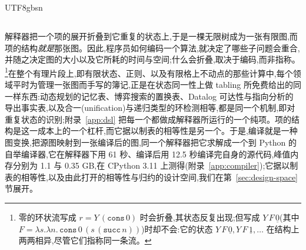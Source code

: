 \begin{CJK*}{UTF8}{gbsn}
  \subsection{}\label{sec:graphs}
  \ifPaperChinese
  解释器把一个项的展开折叠到它重复的状态上,于是一棵无限树成为一张有限图,而项的结构\emph{就是}那张图。因此,程序员如何编码一个算法,就决定了哪些子问题会重合,并随之决定图的大小以及它所耗的时间与空间;什么会折叠,取决于编码,而非指称。\footnote{零的环状流写成 $r = Y\,(\mathtt{cons}\,0)$ 时会折叠,其状态反复出现;但写成 $Y\,F\,\underline{0}$(其中 $F = \lambda s.\lambda n.\,\mathtt{cons}\,0\,(s\,(\mathtt{succ}\,n))$)时却不会:它的状态 $Y\,F\,\underline{0}, Y\,F\,\underline{1}, \dots$ 在结构上两两相异,尽管它们指称同一条流。}在整个有理片段上,即有限状态、正则、以及有限格上不动点的那些计算中,每个领域平时为管理一张图而手写的簿记,正是在状态同一性上做 tabling 所免费给出的同一样东西:动态规划的记忆表、博弈搜索的置换表、Datalog 可达性与指向分析的导出事实表,以及合一(unification)与递归类型的环检测相等,都是同一个机制,即对重复状态的识别;附录~\ref{app:dsl} 把每一个都做成解释器所运行的一个纯项。项的结构是这一成本上的一个杠杆,而它据以制表的相等性是另一个。于是,编译就是一种图变换,把源图映射到一张编译后的图,同一个解释器把它求解成一个到 Python 的自举编译器,它在解释器下用 61 秒、编译后用 12.5 秒编译完自身的源代码,峰值内存分别为 1.1 与 0.35 GB,在 CPython 3.11 上测得(附录~\ref{app:compiler});它据以制表的相等性,以及由此打开的相等性与归约的设计空间,我们在第~\ref{sec:design-space} 节展开。
  \else

\end{CJK*}
